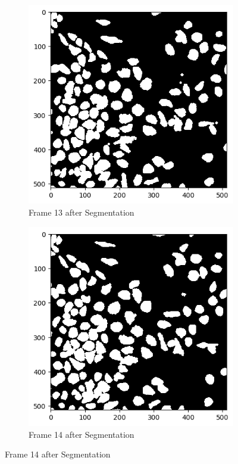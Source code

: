 \documentclass{article}
\begin{document}
\begin{figure}[h!]
  \centering
  \begin{subfigure}{0.4\textwidth}
    \includegraphics[width=\linewidth]{Report/Appendix_Images/Segmentation-A-Control/frame_13.png}
    \caption*{Frame 13 after Segmentation}
  \end{subfigure}
  \hfill
  \begin{subfigure}{0.4\textwidth}
    \includegraphics[width=\linewidth]{Report/Appendix_Images/Segmentation-A-Control/frame_14.png}
    \caption*{Frame 14 after Segmentation}
  \end{subfigure}


\end{figure}
\end{document}
